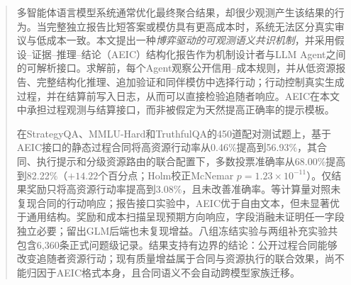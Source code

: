 \begin{abstract}
多智能体语言模型系统通常优化最终聚合结果，却很少观测产生该结果的行为。当完整独立报告比短答案或模仿具有更高成本时，系统无法区分真实审议与低成本一致。本文提出一种\emph{博弈驱动的可观测语义共识机制}，并采用假设--证据--推理--结论（AEIC）结构化报告作为机制设计者与LLM Agent之间的可解析接口。求解前，每个Agent观察公开信用--成本规则，并从低资源报告、完整结构化推理、追加验证和同伴模仿中选择行动；行动控制真实生成过程，并在结算前写入日志，从而可以直接检验追随者响应。AEIC在本文中承担过程观测与结算接口，而非被假定为天然提高正确率的提示模板。

在StrategyQA、MMLU-Hard和TruthfulQA的450道配对测试题上，基于AEIC接口的静态过程合同将高资源行动率从0.46\%提高到56.93\%，其合同、执行提示和分级资源路由的联合配置下，多数投票准确率从68.00\%提高到82.22\%（$+14.22$个百分点；Holm校正McNemar $p=1.23\times10^{-11}$）。仅结果奖励只将高资源行动率提高到3.08\%，且未改善准确率。等计算量对照未复现合同的行动响应；报告接口实验中，AEIC优于自由文本，但未显著优于通用结构。奖励和成本扫描呈现预期方向响应，字段消融未证明任一字段独立必要；留出GLM后端也未复现增益。八组冻结实验与两组补充实验共包含6,360条正式问题级记录。结果支持有边界的结论：公开过程合同能够改变追随者资源行动；现有质量增益属于合同与资源执行的联合效果，尚不能归因于AEIC格式本身，且合同语义不会自动跨模型家族迁移。
\end{abstract}
